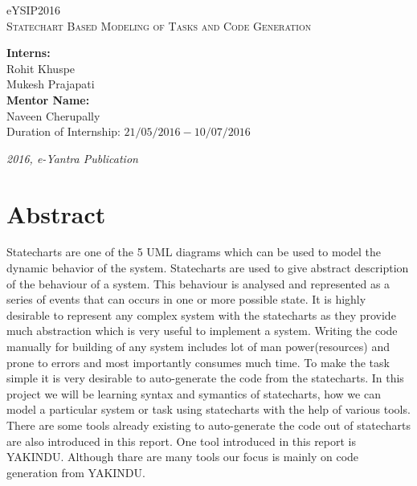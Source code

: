 \documentclass[a4paper,12pt,oneside]{article}
\begin{document}

\begin{titlepage}
\raggedright
{\Large eYSIP2016\\[1cm]}
{\Huge\scshape Statechart Based Modeling of Tasks and Code Generation \\[.1in]}
\vfill
\begin{flushright}
{\Large\textbf{Interns:} \\}
{\large Rohit Khuspe \\}
{\large Mukesh Prajapati \\}
{\Large \textbf{Mentor Name:} \\}
{\large Naveen Cherupally \\}
{\large Duration of Internship: $ 21/05/2016-10/07/2016 $ \\}
\end{flushright}

{\itshape 2016, e-Yantra Publication}
\end{titlepage}



\tableofcontents
\newpage
\section{Abstract}

 Statecharts are one of the 5 UML diagrams which can be used to model the
dynamic behavior of the system. Statecharts are used to give abstract description of the behaviour of a system. This behaviour is analysed and represented as a series of events that can occurs in one or more possible state.
 It is highly desirable to represent any complex system with the
statecharts as they provide much abstraction
 which is very useful to implement a system. Writing the code manually for
building of any system includes lot
 of man power(resources) and prone to errors and most importantly consumes
much time. To make the task simple it is very
 desirable to auto-generate the code from the statecharts.  In this project we will be learning syntax and symantics of statecharts, how we can model a particular system or task using statecharts with the help of various tools. There are some tools already existing to auto-generate the code out of statecharts are also introduced in this report. One tool introduced in this report is YAKINDU. Although thare are many tools our focus is mainly on code generation from YAKINDU.

\newpage
\listoffigures
\newpage
{}
\end{document}

